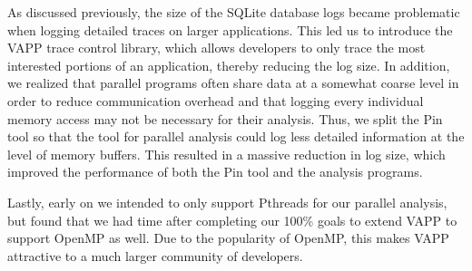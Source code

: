 As discussed previously, the size of the SQLite database logs became
problematic when logging detailed traces on larger applications.
This led us to introduce the VAPP trace control library, which
allows developers to only trace the most interested portions of
an application, thereby reducing the log size.  In addition,
we realized that parallel programs often share data at a somewhat
coarse level in order to reduce communication overhead and that
logging every individual memory access may not be necessary for
their analysis.  Thus, we split the Pin tool so that the tool
for parallel analysis could log less detailed information at the
level of memory buffers.  This resulted in a massive reduction in
log size, which improved the performance of both the Pin tool
and the analysis programs.

Lastly, early on we intended to only support Pthreads for our parallel analysis,
but found that we had time after completing our 100\% goals to extend
VAPP to support OpenMP as well.  Due to the popularity of OpenMP,
this makes VAPP attractive to a much larger community of
developers.

